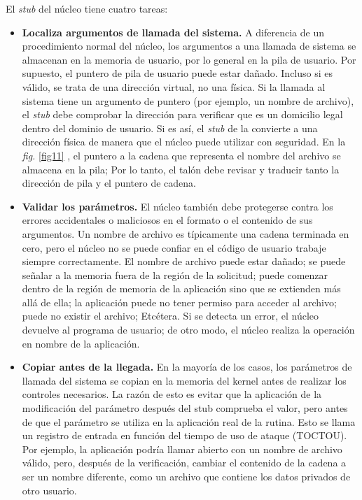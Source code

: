 \documentclass[10pt]{book}
\begin{document}
El \textit{stub} del núcleo tiene cuatro tareas:
\begin{itemize}
\item \textbf{Localiza argumentos de llamada del sistema.} A diferencia de un procedimiento normal del núcleo, los argumentos a una llamada de sistema se almacenan en la memoria de usuario, por lo general en la pila de usuario. Por supuesto, el puntero de pila de usuario puede estar dañado. Incluso si es válido, se trata de una dirección virtual, no una física. Si la llamada al sistema tiene un argumento de puntero (por ejemplo, un nombre de archivo), el \textit{stub} debe comprobar la dirección para verificar que es un domicilio legal dentro del dominio de usuario. Si es así, el \textit{stub} de la convierte a una dirección física de manera que el núcleo puede utilizar con seguridad. En la \textit{fig.} \ref{fig11} , el puntero a la cadena que representa el nombre del archivo se almacena en la pila; Por lo tanto, el talón debe revisar y traducir tanto la dirección de pila y el
puntero de cadena.
\item \textbf{Validar los parámetros.} El núcleo también debe protegerse contra los errores accidentales o maliciosos en el formato o el contenido de sus argumentos. Un nombre de archivo es típicamente una cadena terminada en cero, pero el núcleo no se puede confiar en el código de usuario trabaje siempre correctamente. El nombre de archivo puede estar dañado; se puede señalar a la memoria fuera de la región de la solicitud; puede comenzar dentro de la región de memoria de la aplicación sino que se extienden más allá de ella; la aplicación puede no tener permiso para acceder al archivo; puede no existir el archivo; Etcétera. Si se detecta un error, el núcleo devuelve al programa de usuario; de otro modo, el núcleo realiza la operación en nombre de la aplicación.

\item \textbf{Copiar antes de la llegada.} En la mayoría de los casos, los parámetros de llamada del sistema se copian en la memoria del kernel antes de realizar los controles necesarios. La razón de esto es evitar que la aplicación de la modificación del parámetro después del stub comprueba el valor, pero antes de que el parámetro se utiliza en la aplicación real de la rutina. Esto se llama un registro de entrada en función del tiempo de uso de ataque (TOCTOU). Por ejemplo, la aplicación podría llamar abierto con un nombre de archivo válido, pero, después de la verificación, cambiar el contenido de la cadena a ser un nombre diferente, como un archivo que contiene los datos privados de otro usuario.


\end{itemize}
\end{document}
